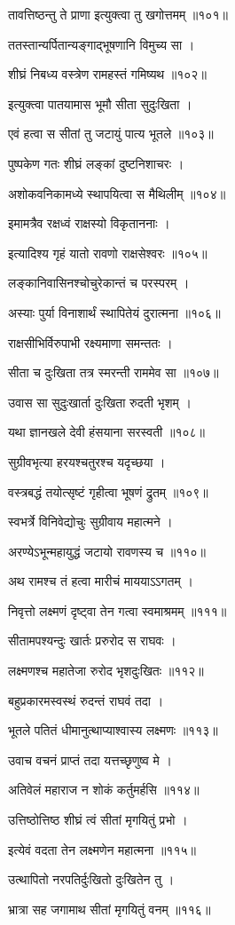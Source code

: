 तावत्तिष्ठन्तु ते प्राणा इत्युक्त्वा तु खगोत्तमम् ॥१०१॥

ततस्तान्यर्पितान्यङ्गाद्भूषणानि विमुच्य सा ।

शीघ्रं निबध्य वस्त्रेण रामहस्तं गमिष्यथ ॥१०२॥

इत्युक्त्वा पातयामास भूमौ सीता सुदुःखिता ।

एवं हत्वा स सीतां तु जटायुं पात्य भूतले ॥१०३॥

पुष्पकेण गतः शीघ्रं लङ्कां दुष्टनिशाचरः ।

अशोकवनिकामध्ये स्थापयित्वा स मैथिलीम् ॥१०४॥

इमामत्रैव रक्षध्वं राक्षस्यो विकृताननाः ।

इत्यादिश्य गृहं यातो रावणो राक्षसेश्वरः ॥१०५॥

लङ्कानिवासिनश्चोचुरेकान्तं च परस्परम् ।

अस्याः पुर्या विनाशार्थं स्थापितेयं दुरात्मना ॥१०६॥

राक्षसीभिर्विरुपाभी रक्ष्यमाणा समन्ततः ।

सीता च दुःखिता तत्र स्मरन्ती राममेव सा ॥१०७॥

उवास सा सुदुःखार्ता दुःखिता रुदती भृशम् ।

यथा ज्ञानखले देवी हंसयाना सरस्वती ॥१०८॥

सुग्रीवभृत्या हरयश्चतुरश्च यदृच्छया ।

वस्त्रबद्धं तयोत्सृष्टं गृहीत्वा भूषणं द्रुतम् ॥१०९॥

स्वभर्त्रे विनिवेद्योचुः सुग्रीवाय महात्मने ।

अरण्येऽभून्महायुद्धं जटायो रावणस्य च ॥११०॥

अथ रामश्च तं हत्वा मारीचं माययाऽऽगतम् ।

निवृत्तो लक्ष्मणं दृष्ट्वा तेन गत्वा स्वमाश्रमम् ॥१११॥

सीतामपश्यन्दुः खार्तः प्ररुरोद स राघवः ।

लक्ष्मणश्च महातेजा रुरोद भृशदुःखितः ॥११२॥

बहुप्रकारमस्वस्थं रुदन्तं राघवं तदा ।

भूतले पतितं धीमानुत्थाप्याश्वास्य लक्ष्मणः ॥११३॥

उवाच वचनं प्राप्तं तदा यत्तच्छृणुष्व मे ।

अतिवेलं महाराज न शोकं कर्तुमर्हसि ॥११४॥

उत्तिष्ठोत्तिष्ठ शीघ्रं त्वं सीतां मृगयितुं प्रभो ।

इत्येवं वदता तेन लक्ष्मणेन महात्मना ॥११५॥

उत्थापितो नरपतिर्दुःखितो दुःखितेन तु ।

भ्रात्रा सह जगामाथ सीतां मृगयितुं वनम् ॥११६॥


